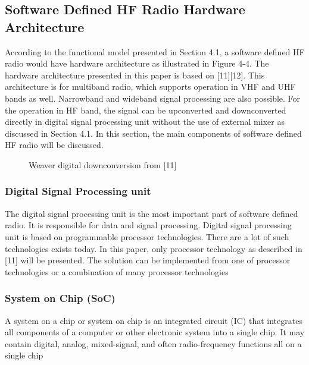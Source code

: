 \documentclass[conference]{IEEEtran}
\begin{document}
\subsection{Software Defined HF Radio Hardware Architecture }
According to the functional model presented in Section 4.1, a software defined HF radio would have hardware architecture as illustrated in Figure 4-4. The hardware architecture presented in this paper is based on [11][12]. This architecture is for multiband radio, which supports operation in VHF and UHF bands as well. Narrowband and wideband signal processing are also possible. For the operation in HF band, the signal can be upconverted and downconverted directly in digital signal processing unit without the use of external mixer as discussed in Section 4.1. In this section, the main components of software defined HF radio will be discussed.
\begin{figure}[h!]
	\centering
	\caption{Weaver digital downconversion from [11]}
	\label{fig:downconversion}
\end{figure} 
\subsubsection{Digital Signal Processing unit}
The digital signal processing unit is the most important part of software defined radio. It is responsible for data and signal processing. Digital signal processing unit is based on programmable processor technologies. There are a lot of such technologies exists today. In this paper, only processor technology as described in [11] will be presented. The solution can be implemented from one of processor technologies or a combination of many processor technologies 
\subsubsection{System on Chip (SoC)}
A system on a chip or system on chip is an integrated circuit (IC) that integrates all components of a computer or other electronic system into a single chip. It may contain digital, analog, mixed-signal, and often radio-frequency functions all on a single chip 
\end{document}
